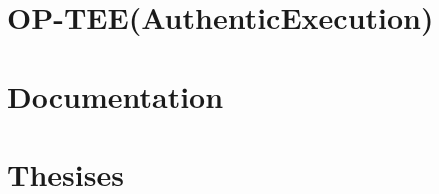 \documentclass{report}
\begin{document}
\chapter{OP-TEE(AuthenticExecution)}





\chapter{Documentation}



\chapter{Thesises}


\end{document}
